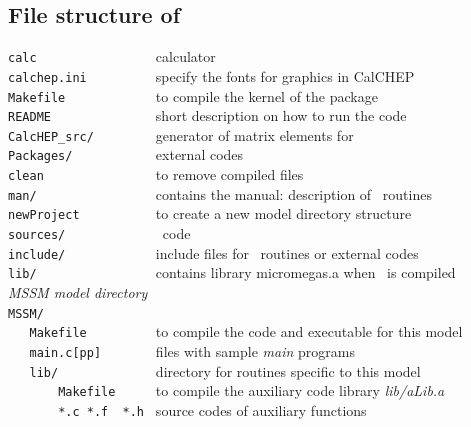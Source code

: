 \documentclass[12pt,a4paper]{article}
\begin{document}
\subsection{File structure of \micro}
\label{file_structure}
\verb|calc                | calculator\\
\verb|calchep.ini         | specify the fonts for graphics in CalCHEP\\
\verb|Makefile            |  to compile the kernel of the package               \\
\verb|README              | short description on how to run the code\\
\verb|CalcHEP_src/        |        generator of matrix elements for \micro   \\
\verb|Packages/           |        external codes    \\
\verb|clean               | to remove compiled files \\
\verb|man/                |    contains the manual: description of \micro\ routines \\
\verb|newProject          |     to create a new model directory   structure                           \\
\verb|sources/            |        \micro\ code                               \\
\verb|include/            |        include files for \micro\ routines or external codes                              \\
\verb|lib/                |        contains library micromegas.a when \micro\ is compiled                               \\
{\it MSSM model directory}                                                          \\
\verb|MSSM/               |                                                      \\
\verb|   Makefile         |  to compile the code and executable for  this model \\
\verb|   main.c[pp]       |       files with sample {\it main} programs      \\
\verb|   lib/             |      directory for routines specific to this model   \\
\verb|       Makefile     |   to compile the auxiliary code library {\it lib/aLib.a}    \\
\verb|       *.c *.f  *.h |      source codes of auxiliary functions             \\
\end{document}
